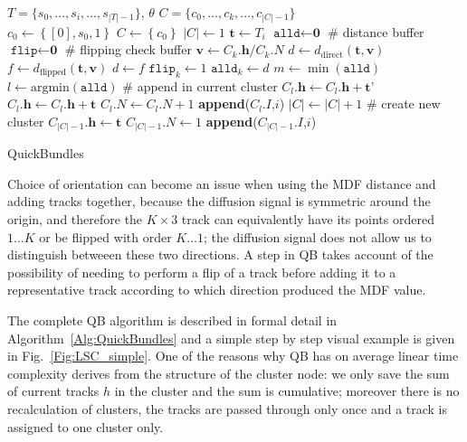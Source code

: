 \documentclass[journal]{IEEEtran}
\begin{document}
\begin{algorithm}
\begin{algorithmic}
\REQUIRE $T=\{s_{0},...,s_{i},...,s_{|T|-1}\}$, $\theta$
\ENSURE $C=\{c_{0},...,c_{k},...,c_{|C|-1}\}$ \\
\STATE $c_{0} \leftarrow \left\{[0],s_{0},1\right\}$
\STATE $C\leftarrow\left\{c_{0}\right\}$
\STATE $|C|\leftarrow1$ 
	\STATE $\textbf{t}\leftarrow T_{i}$
	\STATE $\texttt{alld}\leftarrow\textbf{0}$ \# distance buffer
	\STATE $\texttt{flip}\leftarrow\textbf{0}$ \# flipping check buffer
		\STATE $\mathbf{v}\leftarrow C_{k}.\mathbf{h}/C_{k}.N$
		\STATE $d\leftarrow d_{\textrm{direct}}(\mathbf{t},\mathbf{v})$
		\STATE $f\leftarrow d_{\textrm{flipped}}(\mathbf{t},\mathbf{v})$
		\STATE $d \leftarrow f$
		\STATE $\texttt{flip}_{k} \leftarrow 1$
	\ENDIF
	\STATE $\texttt{alld}_{k} \leftarrow d$
	\ENDFOR
\STATE $m\leftarrow \min(\texttt{alld})$
\STATE $l\leftarrow \mathrm{arg min}(\texttt{alld})$
\STATE \# append in current cluster
		\STATE $C_{l}.\mathbf{h} \leftarrow C_{l}.\mathbf{h} + \textbf{t'}$
	\ELSE
		\STATE $C_{l}.\mathbf{h} \leftarrow C_{l}.\mathbf{h} + \textbf{t}$
	\ENDIF
	\STATE $C_{l}.N \leftarrow C_{l}.N + 1$
	\STATE \textbf{append}($C_{l}.I$,$i$)
\ELSE 
\STATE 
	\STATE $|C|\leftarrow |C|+1$
	\STATE \# create new cluster
	\STATE $C_{|C|-1}.\mathbf{h}\leftarrow \mathbf{t}$
	\STATE $C_{|C|-1}.N\leftarrow 1$
	\STATE \textbf{append}($C_{|C|-1}.I$,$i$)
\ENDIF
\ENDFOR 
\end{algorithmic}

\caption{QuickBundles}
\label{Alg:QuickBundles}
\end{algorithm}

Choice of orientation can become an issue when using the MDF distance
and adding tracks together, because the diffusion signal is symmetric
around the origin, and therefore the $K \times 3$ track can equivalently
have its points ordered $1 \dots K$ or be flipped with order $K \dots
1$; the diffusion signal does not allow us to distinguish betweeen these
two directions. A step in QB takes account of the possibility of needing
to perform a flip of a track before adding it to a representative track
according to which direction produced the MDF value.

The complete QB algorithm is described in formal detail in
Algorithm~\ref{Alg:QuickBundles} and a simple step by step visual example is
given in Fig.~\ref{Fig:LSC_simple}.  One of the reasons why QB has on
average linear time complexity derives from the structure of the cluster
node: we only save the sum of current tracks $h$ in the cluster and the
sum is cumulative; moreover there is no recalculation of clusters, the
tracks are passed through only once and a track is assigned to one
cluster only. 
\end{document}
